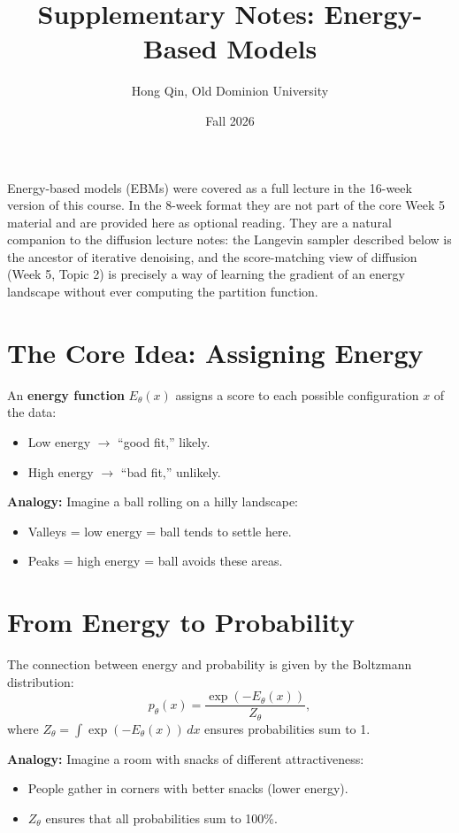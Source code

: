 \documentclass[11pt]{article}
\title{Supplementary Notes: Energy-Based Models}
\author{Hong Qin, Old Dominion University}
\date{Fall 2026}
\theoremstyle{remark}
\begin{document}
\maketitle

\begin{center}
\begin{tcolorbox}[width=0.95\textwidth, title=\textbf{About these supplementary notes}]
Energy-based models (EBMs) were covered as a full lecture in the 16-week version of this course. In the 8-week format they are not part of the core Week 5 material and are provided here as optional reading. They are a natural companion to the diffusion lecture notes: the Langevin sampler described below is the ancestor of iterative denoising, and the score-matching view of diffusion (Week 5, Topic 2) is precisely a way of learning the gradient of an energy landscape without ever computing the partition function.
\end{tcolorbox}
\end{center}

\section{The Core Idea: Assigning Energy}
An \textbf{energy function} $E_\theta(x)$ assigns a score to each possible configuration $x$ of the data:
\begin{itemize}
  \item Low energy $\rightarrow$ ``good fit,'' likely.
  \item High energy $\rightarrow$ ``bad fit,'' unlikely.
\end{itemize}

\textbf{Analogy:} Imagine a ball rolling on a hilly landscape:
\begin{itemize}
  \item Valleys = low energy = ball tends to settle here.
  \item Peaks = high energy = ball avoids these areas.
\end{itemize}

\section{From Energy to Probability}
The connection between energy and probability is given by the Boltzmann distribution:
\[
  p_\theta(x) = \frac{\exp(-E_\theta(x))}{Z_\theta},
\]
where $Z_\theta = \int \exp(-E_\theta(x))\, dx$ ensures probabilities sum to 1.

\textbf{Analogy:} Imagine a room with snacks of different attractiveness:
\begin{itemize}
  \item People gather in corners with better snacks (lower energy).
  \item $Z_\theta$ ensures that all probabilities sum to 100\%.
\end{itemize}
\end{document}
